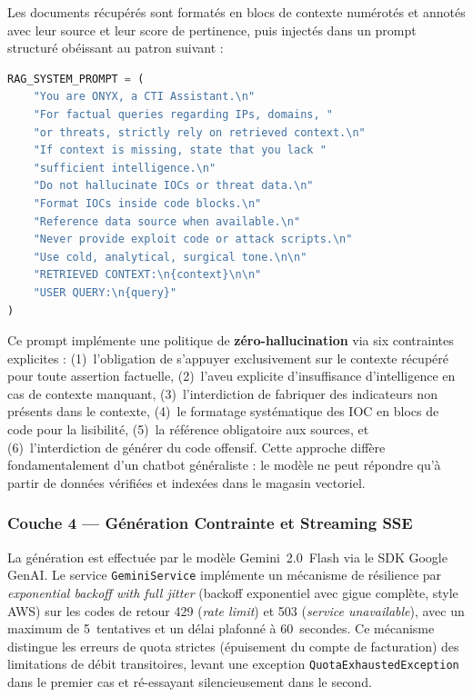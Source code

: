Les documents récupérés sont formatés en blocs de contexte numérotés et annotés avec leur source et leur score de pertinence, puis injectés dans un prompt structuré obéissant au patron suivant :

\begin{lstlisting}[language=Python, caption={Prompt système RAG avec politique de zéro-hallucination et contexte récupéré dynamiquement.}, label={lst:rag-prompt}]
RAG_SYSTEM_PROMPT = (
    "You are ONYX, a CTI Assistant.\n"
    "For factual queries regarding IPs, domains, "
    "or threats, strictly rely on retrieved context.\n"
    "If context is missing, state that you lack "
    "sufficient intelligence.\n"
    "Do not hallucinate IOCs or threat data.\n"
    "Format IOCs inside code blocks.\n"
    "Reference data source when available.\n"
    "Never provide exploit code or attack scripts.\n"
    "Use cold, analytical, surgical tone.\n\n"
    "RETRIEVED CONTEXT:\n{context}\n\n"
    "USER QUERY:\n{query}"
)
\end{lstlisting}

Ce prompt implémente une politique de \textbf{zéro-hallucination} via six contraintes explicites : (1)~l'obligation de s'appuyer exclusivement sur le contexte récupéré pour toute assertion factuelle, (2)~l'aveu explicite d'insuffisance d'intelligence en cas de contexte manquant, (3)~l'interdiction de fabriquer des indicateurs non présents dans le contexte, (4)~le formatage systématique des IOC en blocs de code pour la lisibilité, (5)~la référence obligatoire aux sources, et (6)~l'interdiction de générer du code offensif. Cette approche diffère fondamentalement d'un chatbot généraliste : le modèle ne peut répondre qu'à partir de données vérifiées et indexées dans le magasin vectoriel.

\subsubsection{Couche 4 --- Génération Contrainte et Streaming SSE}

La génération est effectuée par le modèle Gemini~2.0~Flash via le SDK Google GenAI. Le service \texttt{GeminiService} implémente un mécanisme de résilience par \textit{exponential backoff with full jitter} (backoff exponentiel avec gigue complète, style AWS) sur les codes de retour 429 (\textit{rate limit}) et 503 (\textit{service unavailable}), avec un maximum de 5~tentatives et un délai plafonné à 60~secondes. Ce mécanisme distingue les erreurs de quota strictes (épuisement du compte de facturation) des limitations de débit transitoires, levant une exception \texttt{QuotaExhaustedException} dans le premier cas et ré-essayant silencieusement dans le second.


